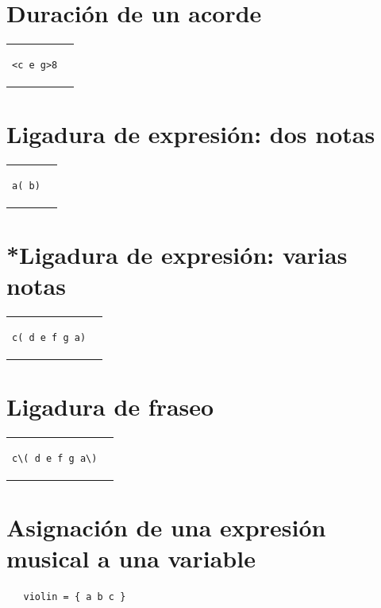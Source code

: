 \documentclass[a4paper,10pt,oneside,headinclude,titlepage]{article} %
\begin{document}
\section*{Duración de un acorde}
\begin{tabular}{m{2cm}m{2cm}}
\begin{verbatim}
<c e g>8
\end{verbatim}
&
\begin[fragment,relative=1,notime]{lilypond}
<c e g>8
\end{lilypond}
\end{tabular}

\section*{Ligadura de expresión: dos notas}
\begin{tabular}{m{2cm}m{2cm}}
\begin{verbatim}
a( b)
\end{verbatim}
&
\begin[fragment,relative=1,notime]{lilypond}
a( b)
\end{lilypond}
\end{tabular}

\section*{*Ligadura de expresión: varias notas}
\begin{tabular}{m{2cm}m{2cm}}
\begin{verbatim}
c( d e f g a)
\end{verbatim}
&
\begin[fragment,relative=1,notime]{lilypond}
c( d e f g a)
\end{lilypond}
\end{tabular}

\section*{Ligadura de fraseo}
\begin{tabular}{m{2.5cm}m{2cm}}
\begin{verbatim}
c\( d e f g a\)
\end{verbatim}
&
\begin[fragment,relative=1,notime]{lilypond}
c\( d e f g a\)
\end{lilypond}
\end{tabular}

\section*{Asignación de una expresión musical a una variable}
\begin{verbatim}
   violin = { a b c }
\end{verbatim}
\end{document}
